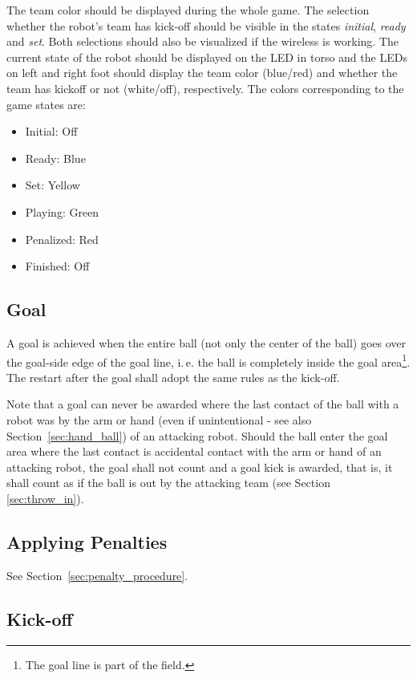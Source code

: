 \documentclass[12pt]{article}
\newcommand{\ie}{\mbox{i.\,e.}\xspace}
\begin{document}
The team color should be displayed during the whole game. The
selection whether the robot's team has kick-off should be visible in
the states \emph{initial}, \emph{ready} and \emph{set}. Both
selections should also be visualized if the wireless is working. The current state of the robot should be displayed on the LED in torso and the LEDs on left and right foot should display the team color (blue/red) and whether the team has kickoff or not (white/off), respectively. The colors corresponding to the game states are:

\begin{itemize}
 \item Initial: Off
 \item Ready: Blue
 \item Set: Yellow
 \item Playing: Green
 \item Penalized: Red
 \item Finished: Off
\end{itemize}

\subsection{Goal}
A goal is achieved when the entire ball (not only the center of the
ball) goes over the goal-side edge of the goal line, \ie the ball
is completely inside the goal area\footnote{The goal line is part of
the field.}. The restart after the goal shall adopt the same
rules as the kick-off.

Note that a goal can never be awarded where the last contact of the ball with a robot was by the arm or hand (even if unintentional - see also Section~\ref{sec:hand_ball}) of an attacking robot. Should the ball enter the goal area where the last contact is accidental contact with the arm or hand of an attacking robot, the goal shall not count and a goal kick is awarded, that is, it shall count as if the ball is out by the attacking team (see Section \ref{sec:throw_in}).

\subsection{Applying Penalties}
See Section~\ref{sec:penalty_procedure}.

\subsection{Kick-off}
\label{sec:kick-off}
\end{document}
